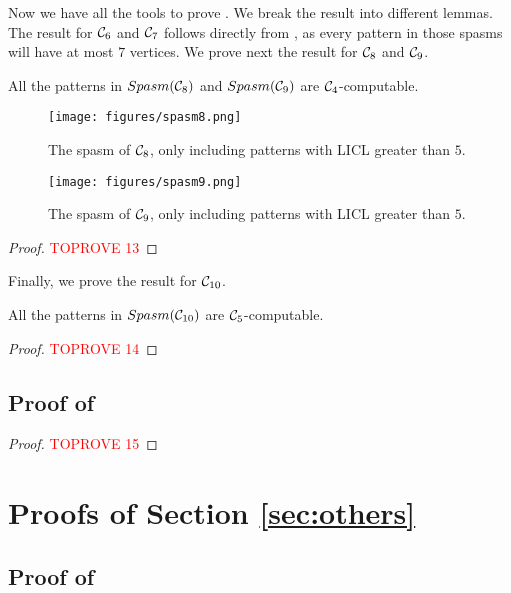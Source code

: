 \documentclass[a4paper,UKenglish,cleveref, autoref, numberwithinsect, thm-restate]{lipics-v2021}
\newcommand{\computable}[1]{${#1}$-computable}
\newcommand{\cycle}[1]{\cC_{#1}}
\newcommand{\LICL}{LICL}
\newcommand{\Spasm}{Spasm}
\newcommand{\cC}{{\cal C}}
\begin{document}
	Now we have all the tools to prove . We break the result into different lemmas. The result for $\cycle{6}$ and $\cycle{7}$ follows directly from , as every pattern in those spasms will have at most $7$ vertices. We prove next the result for $\cycle{8}$ and $\cycle{9}$.
	
	\begin{lemma}
		All the patterns in $\Spasm(\cycle{8})$ and $\Spasm(\cycle{9})$ are \computable{\cycle{4}}.
	\end{lemma}
	
	\begin{figure}
		\centering
		\texttt{[image: figures/spasm8.png]}\caption{The spasm of $\cycle{8}$, only including patterns with \LICL{} greater than $5$.}
		\label{fig:spasm8}
	\end{figure}
	
	\begin{figure}
		\centering
		\texttt{[image: figures/spasm9.png]}\caption{The spasm of $\cycle{9}$, only including patterns with \LICL{} greater than $5$.}
		\label{fig:spasm9}
	\end{figure}
	
	\begin{proof}\textcolor{red}{TOPROVE 13}\end{proof}
	
	Finally, we prove the result for $\cycle{10}$.
	
	\begin{lemma}
		All the patterns in $\Spasm(\cycle{10})$ are \computable{\cycle{5}}.
	\end{lemma}
	\begin{proof}\textcolor{red}{TOPROVE 14}\end{proof}
	
	\subsection{Proof of }
	\uppercycle*
	\begin{proof}\textcolor{red}{TOPROVE 15}\end{proof}
	
	\section{Proofs of Section \ref{sec:others}}
	
	\subsection{Proof of }
	
\end{document}
